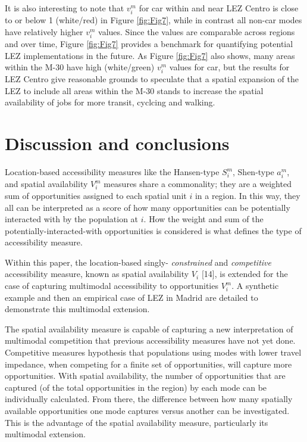 \documentclass[10pt,letterpaper]{article}
\begin{document}
It is also interesting to note that \(v_i^m\) for car within and near
LEZ Centro is close to or below 1 (white/red) in Figure \ref{fig:Fig7},
while in contrast all non-car modes have relatively higher \(v_i^m\)
values. Since the values are comparable across regions and over time,
Figure \ref{fig:Fig7} provides a benchmark for quantifying potential LEZ
implementations in the future. As Figure \ref{fig:Fig7} also shows, many
areas within the M-30 have high (white/green) \(v_i^m\) values for car,
but the results for LEZ Centro give reasonable grounds to speculate that
a spatial expansion of the LEZ to include all areas within the M-30
stands to increase the spatial availability of jobs for more transit,
cyclcing and walking.

\hypertarget{discussion-and-conclusions}{%
\section{Discussion and conclusions}\label{discussion-and-conclusions}}

Location-based accessibility measures like the Hansen-type \(S_i^m\),
Shen-type \(a_i^m\), and spatial availability \(V_i^m\) measures share a
commonality; they are a weighted sum of opportunities assigned to each
spatial unit \(i\) in a region. In this way, they all can be interpreted
as a score of how many opportunities can be potentially interacted with
by the population at \(i\). How the weight and sum of the
potentially-interacted-with opportunities is considered is what defines
the type of accessibility measure.

Within this paper, the location-based singly- \emph{constrained} and
\emph{competitive} accessibility measure, known as spatial availability
\(V_i\) {[}14{]}, is extended for the case of capturing multimodal
accessibility to opportunities \(V_i^m\). A synthetic example and then
an empirical case of LEZ in Madrid are detailed to demonstrate this
multimodal extension.

The spatial availability measure is capable of capturing a new
interpretation of multimodal competition that previous accessibility
measures have not yet done. Competitive measures hypothesis that
populations using modes with lower travel impedance, when competing for
a finite set of opportunities, will capture more opportunities. With
spatial availability, the number of opportunities that are captured (of
the total opportunities in the region) by each mode can be individually
calculated. From there, the difference between how many spatially
available opportunities one mode captures versus another can be
investigated. This is the advantage of the spatial availability measure,
particularly its multimodal extension.
\end{document}
